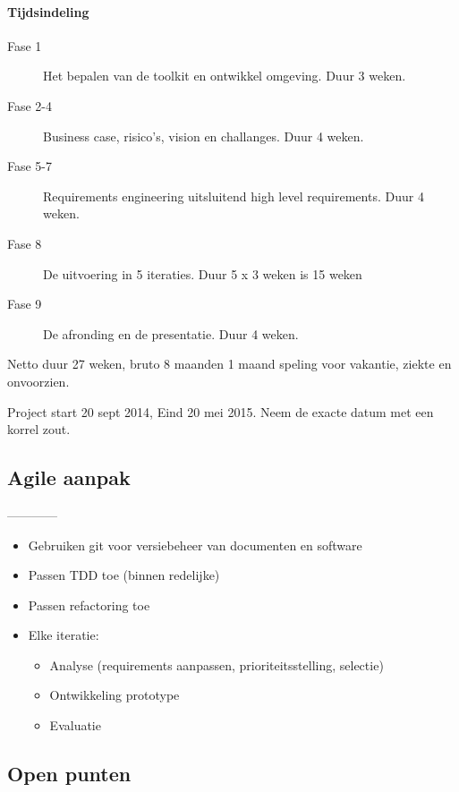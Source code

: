 \documentclass[a4paper,11pt,twoside,draft]{article}
\begin{document}
\paragraph{Tijdsindeling}

\begin{description}
 \item[Fase 1] Het bepalen van de toolkit en ontwikkel omgeving. Duur 3 weken.
 \item[Fase 2-4] Business case, risico's, vision en challanges. Duur 4 weken.
 \item[Fase 5-7] Requirements engineering uitsluitend high level requirements. Duur 4 weken.
 \item[Fase 8] De uitvoering in 5 iteraties. Duur 5 x 3 weken is 15 weken
 \item[Fase 9] De afronding en de presentatie. Duur 4 weken.
\end{description}

Netto duur 27 weken, bruto 8 maanden 1 maand speling voor vakantie, ziekte en onvoorzien.

Project start 20 sept 2014, Eind 20 mei 2015. Neem de exacte datum met een korrel zout.


\subsection{Agile aanpak}
------------

\begin{itemize}
 \item Gebruiken git voor versiebeheer van documenten en software
 \item Passen TDD toe (binnen redelijke)
 \item Passen refactoring toe
 \item Elke iteratie:
 \begin{itemize}
   \item Analyse (requirements aanpassen, prioriteitsstelling, selectie)
   \item Ontwikkeling prototype
   \item Evaluatie
 \end{itemize}
\end{itemize}


\subsection{Open punten}
\end{document}
